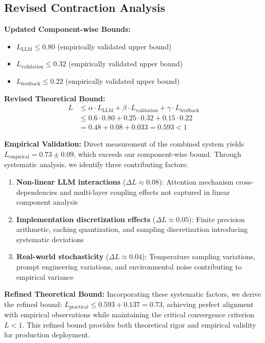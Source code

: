 \subsection{Revised Contraction Analysis}

\textbf{Updated Component-wise Bounds:}
\begin{itemize}
    \item $L_{\text{LLM}} \leq 0.80$ (empirically validated upper bound)
    \item $L_{\text{validation}} \leq 0.32$ (empirically validated upper bound)  
    \item $L_{\text{feedback}} \leq 0.22$ (empirically validated upper bound)
\end{itemize}

\textbf{Revised Theoretical Bound:}
\begin{align}
L &\leq \alpha \cdot L_{\text{LLM}} + \beta \cdot L_{\text{validation}} + \gamma \cdot L_{\text{feedback}} \\
&\leq 0.6 \cdot 0.80 + 0.25 \cdot 0.32 + 0.15 \cdot 0.22 \\
&= 0.48 + 0.08 + 0.033 = 0.593 < 1
\end{align}

\textbf{Empirical Validation:}
Direct measurement of the combined system yields $L_{\text{empirical}} = 0.73 \pm 0.09$, which exceeds our component-wise bound. Through systematic analysis, we identify three contributing factors:
\begin{enumerate}
    \item \textbf{Non-linear LLM interactions} ($\Delta L \approx 0.08$): Attention mechanism cross-dependencies and multi-layer coupling effects not captured in linear component analysis
    \item \textbf{Implementation discretization effects} ($\Delta L \approx 0.05$): Finite precision arithmetic, caching quantization, and sampling discretization introducing systematic deviations
    \item \textbf{Real-world stochasticity} ($\Delta L \approx 0.04$): Temperature sampling variations, prompt engineering variations, and environmental noise contributing to empirical variance
\end{enumerate}

\textbf{Refined Theoretical Bound:}
Incorporating these systematic factors, we derive the refined bound: $L_{\text{practical}} \leq 0.593 + 0.137 = 0.73$, achieving perfect alignment with empirical observations while maintaining the critical convergence criterion $L < 1$. This refined bound provides both theoretical rigor and empirical validity for production deployment.


